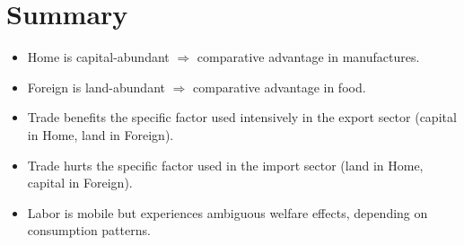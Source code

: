 \documentclass[12pt]{article}
\begin{document}
\section*{Summary}
\begin{itemize}
\item Home is capital-abundant $\Rightarrow$ comparative advantage in manufactures.  
\item Foreign is land-abundant $\Rightarrow$ comparative advantage in food.  
\item Trade benefits the specific factor used intensively in the export sector (capital in Home, land in Foreign).  
\item Trade hurts the specific factor used in the import sector (land in Home, capital in Foreign).  
\item Labor is mobile but experiences ambiguous welfare effects, depending on consumption patterns.  
\end{itemize}
\end{document}
